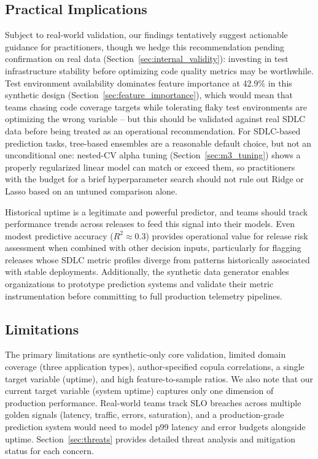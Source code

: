 \documentclass[technologies,article,submit,pdftex,moreauthors]{Definitions/mdpi}
\begin{document}
\subsection{Practical Implications}\label{sec:practical_implications}

Subject to real-world validation, our findings tentatively suggest
actionable guidance for practitioners, though we hedge this
recommendation pending confirmation on real data (Section~\ref{sec:internal_validity}):
investing in test infrastructure stability before optimizing code
quality metrics may be worthwhile. Test environment availability
dominates feature importance at 42.9\% in this synthetic design (Section~\ref{sec:feature_importance}), which would mean that teams chasing code coverage targets while
tolerating flaky test environments are optimizing the wrong variable --
but this should be validated against real SDLC data before being treated
as an operational recommendation. For SDLC-based prediction tasks, tree-based
ensembles are a reasonable default choice, but not an unconditional one:
nested-CV alpha tuning (Section~\ref{sec:m3_tuning}) shows a properly regularized
linear model can match or exceed them, so practitioners with the budget for a
brief hyperparameter search should not rule out Ridge or Lasso based on an
untuned comparison alone.

Historical uptime is a legitimate and powerful predictor, and teams
should track performance trends across releases to feed this signal into
their models. Even modest predictive accuracy (\(R^2 \approx 0.3\))
provides operational value for release risk assessment when combined
with other decision inputs, particularly for flagging releases whose
SDLC metric profiles diverge from patterns historically associated with
stable deployments. Additionally, the synthetic data generator enables
organizations to prototype prediction systems and validate their metric
instrumentation before committing to full production telemetry
pipelines.

\subsection{Limitations}\label{sec:limitations}

The primary limitations are synthetic-only core validation, limited
domain coverage (three application types), author-specified copula
correlations, a single target variable (uptime), and high
feature-to-sample ratios. We also note that our current target variable
(system uptime) captures only one dimension of production performance.
Real-world teams track SLO breaches across multiple golden signals
(latency, traffic, errors, saturation), and a production-grade
prediction system would need to model p99 latency and error budgets
alongside uptime. Section~\ref{sec:threats} provides
detailed threat analysis and mitigation status for each concern.
\end{document}
